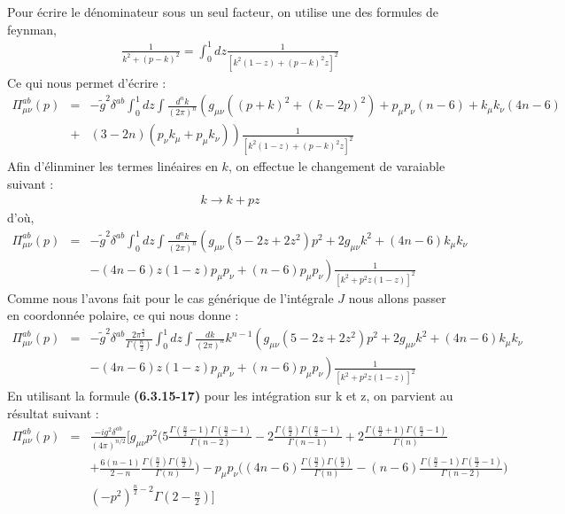 \documentclass[a4paper,11pt]{article}
\theoremstyle{plain}
\theoremstyle{definition}
\theoremstyle{remark}
\numberwithin{equation}{section}
\numberwithin{equation}{subsection}
\numberwithin{figure}{section}
\begin{document}
\noindent
Pour écrire le dénominateur sous un seul facteur, on utilise une des formules de feynman,
\begin{eqnarray}
 \frac{1}{k^2+(p-k)^2} = \int_0^{1} dz \frac{1}{\left[k^2(1-z)+(p-k)^2z\right]^2}
\end{eqnarray} 
Ce qui nous permet d'écrire :
\begin{eqnarray}
 \Pi^{ab}_{\mu\nu}(p) &=&  -\tilde{g}^{2}  \delta^{ab} \int_0^{1} dz \int \frac{d^{n}k}{\left(2\pi\right)^n} 
\left( g_{\mu\nu}\left((p+k)^{2} +(k-2p)^2\right) + p_{\mu}p_{\nu}\left(n-6\right)+k_{\mu}k_{\nu}\left(4n-6\right)\right.\nonumber    \\
&+& \left. (3-2n)(p_{\nu}k_{\mu}+p_{\mu}k_{\nu}) \right) \frac{1}{\left[k^2(1-z)+(p-k)^2z\right]^2}
\end{eqnarray}
Afin d'élinminer les termes linéaires en $k$, on effectue le changement de varaiable suivant :
\begin{eqnarray}
 k \rightarrow k+pz
\end{eqnarray}
d'où,
\begin{eqnarray}
 \Pi^{ab}_{\mu\nu}(p) &=&  -\tilde{g}^{2}  \delta^{ab} \int_0^{1} dz \int \frac{d^{n}k}{\left(2\pi\right)^n} 
\left(g_{\mu\nu} (5-2z+2z^2)p^2 + 2g_{\mu\nu}k^2 + (4n-6)k_{\mu}k_{\nu}\right. \nonumber  \\
&& \left. -(4n-6)z(1-z)p_{\mu}p_{\nu} +(n-6)p_{\mu}p_{\nu}  \right)
\frac{1}{\left[k^2 + p^2 z (1-z) \right]^2} 
\end{eqnarray}
Comme nous l'avons fait pour le cas générique de l'intégrale $J$ nous allons passer en coordonnée polaire, ce qui nous donne :
\begin{eqnarray}
 \Pi^{ab}_{\mu\nu}(p) &=&  -\tilde{g}^{2}  \delta^{ab}  \frac{2 \pi^{\frac{n}{2}}}{\Gamma(\frac{n}{2})}  \int_0^{1} dz 
\int \frac{dk}{\left(2\pi\right)^n} k^{n-1}
\left(g_{\mu\nu} (5-2z+2z^2)p^2 + 2g_{\mu\nu}k^2 + (4n-6)k_{\mu}k_{\nu}\right. \nonumber  \\
&& \left. -(4n-6)z(1-z)p_{\mu}p_{\nu} +(n-6)p_{\mu}p_{\nu}  \right)
\frac{1}{\left[k^2 + p^2 z (1-z) \right]^2} 
\end{eqnarray}
En utilisant la formule \textbf{(6.3.15-17)} pour les intégration sur k et z, on parvient au résultat suivant :
\begin{eqnarray}
\Pi^{ab}_{\mu\nu}(p) &=& \frac{-i g^2 \delta^{ab}}{\left(4\pi\right)^{n/2}}   \Bigg[  
g_{\mu\nu}p^2  \bigg(
5\frac{\Gamma(\frac{n}{2}-1)\Gamma(\frac{n}{2}-1)}{\Gamma(n-2)} 
-2\frac{\Gamma(\frac{n}{2})\Gamma(\frac{n}{2}-1)}{\Gamma(n-1)}
+2\frac{\Gamma(\frac{n}{2}+1)\Gamma(\frac{n}{2}-1)}{\Gamma(n)}       \nonumber   \\ 
&& +\frac{6(n-1)}{2-n}\frac{\Gamma(\frac{n}{2})\Gamma(\frac{n}{2})}{\Gamma(n)} \bigg)
-p_{\mu}p_{\nu}
\bigg((4n-6)\frac{\Gamma(\frac{n}{2})\Gamma(\frac{n}{2})}{\Gamma(n)}
-(n-6)\frac{\Gamma(\frac{n}{2}-1)\Gamma(\frac{n}{2}-1)}{\Gamma(n-2)}  \bigg)  \nonumber  \\
&& (-p^2)^{\frac{n}{2}-2}\Gamma(2-\frac{n}{2})   \Bigg]
\end{eqnarray}
\end{document}
